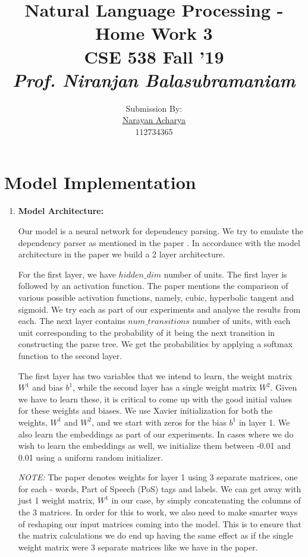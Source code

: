 \documentclass[11pt]{article}
\title{
	Natural Language Processing - Home Work 3\\[2mm]
	\large CSE 538 Fall '19\\[1mm]
	\textit{Prof. Niranjan Balasubramaniam}
}
\author{
	\small Submission By: \\
	\href{mailto:nacharya@cs.stonybrook.edu}{Narayan Acharya} \\
	\small 112734365
}
\date{\vspace{-5ex}}
\begin{document}
	
\maketitle
\thispagestyle{fancy} %

\tableofcontents

\section{Model Implementation}
\begin{enumerate}

\item \textbf{Model Architecture:} 

Our model is a neural network for dependency parsing. We try to emulate the dependency parser as mentioned in the paper \cite{DependencyParserNeuralNetwork}. In accordance with the model architecture in the paper we build a 2 layer architecture.

For the first layer, we have $hidden\_dim$ number of units. The first layer is followed by an activation function. The paper mentions the comparison of various possible activation functions, namely, cubic, hyperbolic tangent and sigmoid. We try each as part of our experiments and analyse the results from each. The next layer contains $num\_transitions$ number of units, with each unit corresponding to the probability of it being the next transition in constructing the parse tree. We get the probabilities by applying a softmax function to the second layer.

The first layer has two variables that we intend to learn, the weight matrix $W^1$ and bias $b^1$, while the second layer has a single weight matrix $W^2$. Given we have to learn these, it is critical to come up with the good initial values for these weights and biases. We use Xavier initialization for both the weights, $W^1$ and $W^2$, and we start with zeros for the bias $b^1$ in layer 1. We also learn the embeddings as part of our experiments. In cases where we do wish to learn the embeddings as well, we initialize them between -0.01 and 0.01 using a uniform random initializer.

\textit{NOTE:} The paper denotes weights for layer 1 using 3 separate matrices, one for each - words, Part of Speech (PoS) tags and labels. We can get away with just 1 weight matrix, $W^1$ in our case, by simply concatenating the columns of the 3 matrices. In order for this to work, we also need to make smarter ways of reshaping our input matrices coming into the model. This is to ensure that the matrix calculations we do end up having the same effect as if the single weight matrix were 3 separate matrices like we have in the paper.


\end{enumerate}
\end{document}
